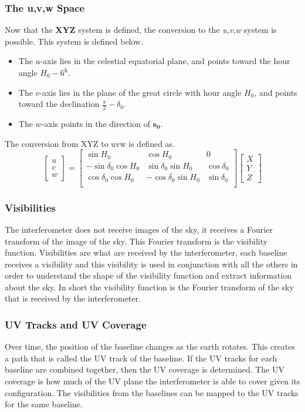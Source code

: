 \subsubsection{The u,v,w Space}
Now that the \textbf{XYZ} system is defined, the conversion to the \textit{u,v,w} system is possible. This system is defined below.
\begin{itemize}
    \item The $u$-axis lies in the celestial equatorial plane, and points toward the hour angle $H_0-6^\text{h}$.
    \item The $v$-axis lies in the plane of the great circle with hour angle $H_0$, and points toward the declination $\frac{\pi}{2}-\delta_0$.
    \item The $w$-axis points in the direction of $\mathbf{s_0}$.
\end{itemize}
The conversion from XYZ to uvw is defined as.
\begin{equation}
\begin{bmatrix}
u\\v\\w
\end{bmatrix}=
\begin{bmatrix}
\sin H_0 & \cos H_0 & 0\\ 
-\sin \delta_0 \cos H_0 & \sin\delta_0\sin H_0 & \cos\delta_0\\
\cos \delta_0 \cos H_0 & -\cos\delta_0\sin H_0 & \sin\delta_0\\
\end{bmatrix} 
\begin{bmatrix}
X\\Y\\Z
\end{bmatrix}
\end{equation}
\subsubsection{Visibilities}
The interferometer does not receive images of the sky, it receives a Fourier transform of the image of the sky. This Fourier transform is the visibility function.
Visibilities are what are received by the interferometer, each baseline receives a visibility and this visibility is used in conjunction with all the others in order to understand the shape of the visibility function and extract information about the sky. In short the visibility function is the Fourier transform of the sky that is received by the interferometer.
\subsubsection{UV Tracks and UV Coverage}
Over time, the position of the baseline changes as the earth rotates. This creates a path that is called the UV track of the baseline. If the UV tracks for each baseline are combined together, then the UV coverage is determined. The UV coverage is how much of the UV plane the interferometer is able to cover given its configuration. The visibilities from the baselines can be mapped to the UV tracks for the same baseline. 

